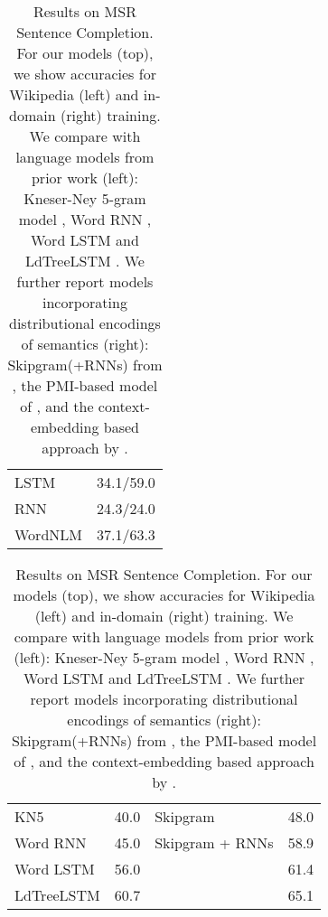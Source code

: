 \begin{table}[t]
  \footnotesize{
    \begin{center}
      \begin{tabular}{l|l}
\hline
        LSTM 	    &      34.1/59.0 \\ %
        RNN  &     24.3/24.0 \\ %
        WordNLM & 37.1/63.3 \\ %
\end{tabular}

\begin{tabular}{l|l||l|l}
\hline
        KN5   & 40.0            & Skipgram         & 48.0    \\                                
        Word RNN & 45.0         & Skipgram + RNNs  & 58.9 \\                                  
        Word LSTM & 56.0        & \citet{woods2016exploiting} &  61.4 \\                      
        LdTreeLSTM  & 60.7     &  \citet{melamud2016context2vec} & 65.1 \\       \hline
             \end{tabular}
    \end{center}
  }
	\caption{\label{tab:msr-completion-results} Results on MSR Sentence Completion. For our models (top), we show accuracies for  Wikipedia (left) and in-domain (right) training. We compare with language models from prior work (left): Kneser-Ney 5-gram model \cite{Mikolov:2012}, Word RNN \cite{zweig2012computational}, Word LSTM and LdTreeLSTM \cite{zhang2016top}. We further report models incorporating distributional encodings of semantics (right): Skipgram(+RNNs) from , the PMI-based model of \citet{woods2016exploiting}, and the context-embedding based approach by \citet{melamud2016context2vec}.}
\end{table}


